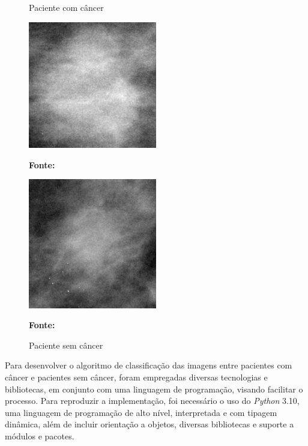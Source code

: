 \begin{figure}[ht]
\centering
    \begin{minipage}[b]{0.45\textwidth}
        \centering
        \caption{Paciente com câncer}
        \includegraphics[width=0.5\textwidth]{figuras/with_cancer.jpg}
        \label{fig:pcc}
        
        \textbf{\footnotesize Fonte: \href{https://www.kaggle.com/datasets/awsaf49/cbis-ddsm-breast-cancer-image-dataset}{\cite{newdatabase}}}
    \end{minipage}
    \hfill
    \begin{minipage}[b]{0.45\textwidth}
        \centering
        \caption{Paciente sem câncer}
        \includegraphics[width=0.5\textwidth]{figuras/without_cancer.jpg}
        \label{fig:psc}
        
        \textbf{\footnotesize Fonte: \href{https://www.kaggle.com/datasets/awsaf49/cbis-ddsm-breast-cancer-image-dataset}{\cite{newdatabase}}}
    \end{minipage}
\end{figure}


Para desenvolver o algoritmo de classificação das imagens entre pacientes com câncer e pacientes sem câncer, foram empregadas diversas tecnologias e bibliotecas, em conjunto com uma linguagem de programação, visando facilitar o processo. Para reproduzir a implementação, foi necessário o uso do \textit{Python} 3.10, uma linguagem de programação de alto nível, interpretada e com tipagem dinâmica, além de incluir orientação a objetos, diversas bibliotecas e suporte a módulos e pacotes.

